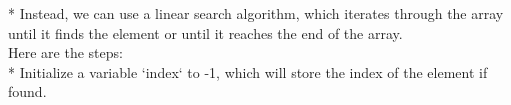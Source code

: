 \documentclass[preview]{standalone}
\begin{document}
* Instead, we can use a linear search algorithm, which iterates through the array until it finds the element or until it reaches the end of the array.\\Here are the steps:\\* Initialize a variable `index` to -1, which will store the index of the element if found.\\
\end{document}
